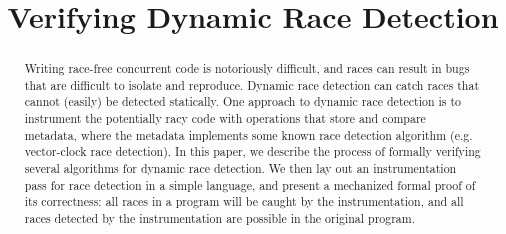 \documentclass[preprint, 9pt]{sigplanconf}
\newcommand{\TODO}[1]{\textbf{\textcolor{red}{[ TODO: #1]}}}
\newcommand{\FT}{\textsc{FastTrack}\xspace}
\begin{document}
\setlength{\pdfpageheight}{\paperheight}
\setlength{\pdfpagewidth}{\paperwidth}





\titlebanner{}        %
\preprintfooter{}   %

\title{Verifying Dynamic Race Detection}
\authorinfo{}{}{}
\maketitle

\begin{abstract}
Writing race-free concurrent code is notoriously difficult, and races can result in bugs that are difficult to isolate and reproduce. Dynamic race detection can catch races that cannot (easily) be detected statically. One approach to dynamic race detection is to instrument the potentially racy code with operations that store and compare metadata, where the metadata implements some known race detection algorithm (e.g. vector-clock race detection). In this paper, we describe the process of formally verifying several algorithms for dynamic race detection. We then lay out an instrumentation pass for race detection in a simple language, and present a mechanized formal proof of its correctness: all races in a program will be caught by the instrumentation, and all races detected by the instrumentation are possible in the original program. %
\end{abstract}
\end{document}
